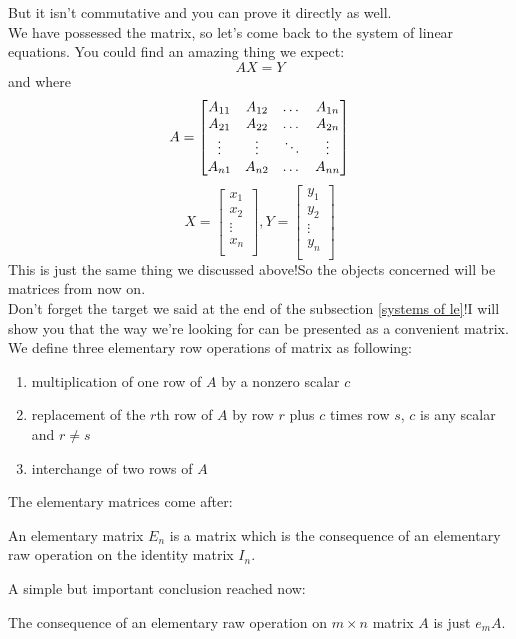 \documentclass{article}
\begin{document}
But it isn't commutative and you can prove it directly as well.\\
\indent We have possessed the matrix, so let's come back to the system of linear equations. You could find an amazing thing we expect:
\[AX=Y\]and where
\[A=\begin{bmatrix}
	A_{11}&A_{12}&$\ldots$&A_{1n}\\
	A_{21}&A_{22}&$\ldots$&A_{2n}\\
	\vdots&\vdots&\ddots&\vdots\\
	A_{n1}&A_{n2}&$\ldots$&A_{nn}
\end{bmatrix}\]
\[X=\begin{bmatrix}
	x_1\\
	x_2\\
	\vdots\\
	x_n\\
\end{bmatrix},
Y=\begin{bmatrix}
y_1\\
y_2\\
\vdots\\
y_n\\
\end{bmatrix}\]This is just the same thing we discussed above!So the objects concerned will be matrices from now on.\\
\indent Don't forget the target we said at the end of the subsection \ref{systems of le}!I will show you that the way we're looking for can be presented as a convenient matrix.\\
\indent We define three elementary row operations of matrix as following:
\begin{enumerate}
	\item multiplication of one row of $A$ by a nonzero scalar $c$
	\item replacement of the $r$th row of $A$ by row $r$ plus $c$ times row $s$, $c$ is any scalar and $r\neq s$
	\item interchange of two rows of $A$
\end{enumerate}
The elementary matrices come after:
\begin{dde}
	An elementary matrix $E_n$ is a matrix which is the consequence of an elementary raw operation on the identity matrix $I_n$. 
\end{dde}
A simple but important conclusion reached now:
\begin{pro}
	The consequence of an elementary raw operation on $m\times n$ matrix $A$ is just $e_mA$.
\end{pro}
\end{document}
